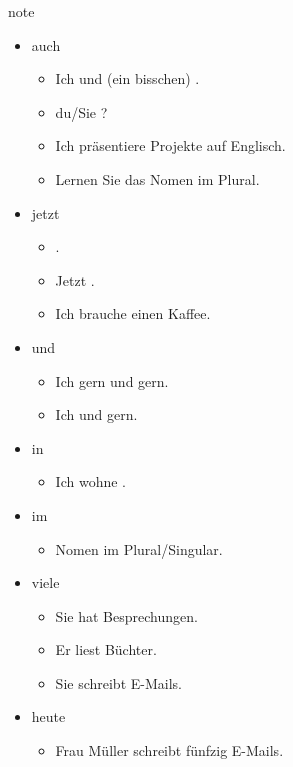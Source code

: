 \begin{syntax}{note}{}
\begin{itemize}
	\item auch \begin{itemize}
		\item Ich \verbhere \fillhere und  (ein bisschen) \fillhere .
		\item \verbhere du/Sie  \fillhere ?
		\item Ich präsentiere  Projekte auf Englisch.
		\item Lernen Sie das Nomen  im Plural.
	\end{itemize}
	\item jetzt \begin{itemize}
		\item \fillhere \verbhere {} \fillhere .
		\item Jetzt \fillhere \verbhere \fillhere .
		\item Ich brauche  einen Kaffee.
	\end{itemize}
	\item und \begin{itemize}
		\item Ich \verbhere \fillhere gern und \verbhere \fillhere gern.
		\item Ich \verbhere \fillhere und \verbhere \fillhere gern.
	\end{itemize}
	\item in \begin{itemize}
		\item Ich wohne  \fillhere .
	\end{itemize}
	\item im \begin{itemize}
		\item Nomen im Plural/Singular.
	\end{itemize}
	\item viele \begin{itemize}
		\item Sie hat  Besprechungen.
		\item Er liest  Büchter.
		\item Sie schreibt  E-Mails.
	\end{itemize}
	\item heute \begin{itemize}
		\item Frau Müller schreibt  fünfzig E-Mails.
	\end{itemize}

\end{itemize}
\end{syntax}
